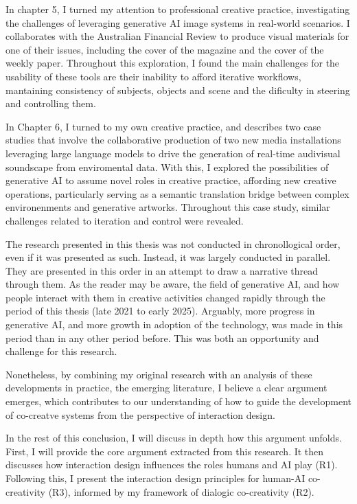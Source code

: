 In chapter 5, I turned my attention to professional creative practice, investigating the challenges of leveraging generative AI image systems in real-world scenarios. I collaborates with the Australian Financial Review to produce visual materials for one of their issues, including the cover of the magazine and the cover of the weekly paper. Throughout this exploration, I found the main challenges for the usability of these tools are their inability to afford iterative workflows, mantaining consistency of subjects, objects and scene and the dificulty in steering and controlling them. 

In Chapter 6, I turned to my own creative practice, and describes two case studies that involve the collaborative production of two new media installations leveraging large language models to drive the generation of real-time audivisual soundscape from enviromental data. With this, I explored the possibilities of generative AI to assume novel roles in creative practice, affording new creative operations, particularly serving as a semantic translation bridge between complex environenments and generative artworks. Throughout this case study, similar challenges related to iteration and control were revealed. 

The research presented in this thesis was not conducted in chronollogical order, even if it was presented as such. Instead, it was largely conducted in parallel. They are presented in this order in an attempt to draw a narrative thread through them. As the reader may be aware, the field of generative AI, and how people interact with them in creative activities changed rapidly through the period of this thesis (late 2021 to early 2025). Arguably, more progress in generative AI, and more growth in adoption of the technology, was made in this period than in any other period before. This was both an opportunity and challenge for this research.

Nonetheless, by combining my original research with an analysis of these developments in practice, the emerging literature, I believe a clear argument emerges, which contributes to our understanding of how to guide the development of co-creatve systems from the perspective of interaction design. 

In the rest of this conclusion, I will discuss in depth how this argument unfolds. 
First, I will provide the core argument extracted from this research. It then discusses how interaction design influences the roles humans and AI play (R1). Following this, I present the interaction design principles for human-AI co-creativity (R3), informed by my framework of dialogic co-creativity (R2).

